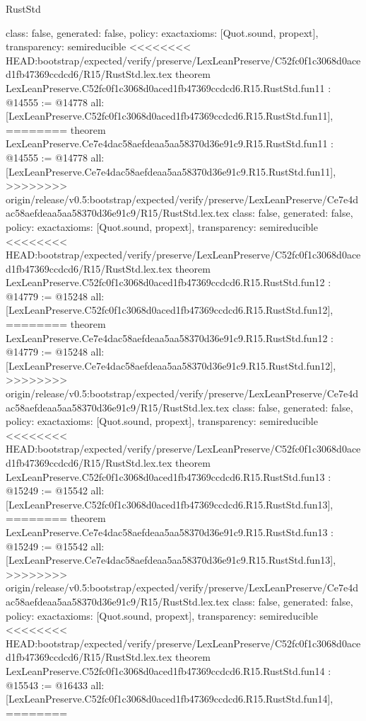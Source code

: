 \begin{lexlean}{RustStd}
\begin{coremodule}
{\begin{coremodule}
{{{{{{{{{{{{{{  class: false,
  generated: false,
  policy: exact{axioms: [Quot.sound, propext]},
  transparency: semireducible
}
<<<<<<<< HEAD:bootstrap/expected/verify/preserve/LexLeanPreserve/C52fc0f1c3068d0aced1fb47369ccdcd6/R15/RustStd.lex.tex
theorem LexLeanPreserve.C52fc0f1c3068d0aced1fb47369ccdcd6.R15.RustStd.fun11 : @14555 := @14778 {
  all: [LexLeanPreserve.C52fc0f1c3068d0aced1fb47369ccdcd6.R15.RustStd.fun11],
========
theorem LexLeanPreserve.Ce7e4dac58aefdeaa5aa58370d36e91c9.R15.RustStd.fun11 : @14555 := @14778 {
  all: [LexLeanPreserve.Ce7e4dac58aefdeaa5aa58370d36e91c9.R15.RustStd.fun11],
>>>>>>>> origin/release/v0.5:bootstrap/expected/verify/preserve/LexLeanPreserve/Ce7e4dac58aefdeaa5aa58370d36e91c9/R15/RustStd.lex.tex
  class: false,
  generated: false,
  policy: exact{axioms: [Quot.sound, propext]},
  transparency: semireducible
}
<<<<<<<< HEAD:bootstrap/expected/verify/preserve/LexLeanPreserve/C52fc0f1c3068d0aced1fb47369ccdcd6/R15/RustStd.lex.tex
theorem LexLeanPreserve.C52fc0f1c3068d0aced1fb47369ccdcd6.R15.RustStd.fun12 : @14779 := @15248 {
  all: [LexLeanPreserve.C52fc0f1c3068d0aced1fb47369ccdcd6.R15.RustStd.fun12],
========
theorem LexLeanPreserve.Ce7e4dac58aefdeaa5aa58370d36e91c9.R15.RustStd.fun12 : @14779 := @15248 {
  all: [LexLeanPreserve.Ce7e4dac58aefdeaa5aa58370d36e91c9.R15.RustStd.fun12],
>>>>>>>> origin/release/v0.5:bootstrap/expected/verify/preserve/LexLeanPreserve/Ce7e4dac58aefdeaa5aa58370d36e91c9/R15/RustStd.lex.tex
  class: false,
  generated: false,
  policy: exact{axioms: [Quot.sound, propext]},
  transparency: semireducible
}
<<<<<<<< HEAD:bootstrap/expected/verify/preserve/LexLeanPreserve/C52fc0f1c3068d0aced1fb47369ccdcd6/R15/RustStd.lex.tex
theorem LexLeanPreserve.C52fc0f1c3068d0aced1fb47369ccdcd6.R15.RustStd.fun13 : @15249 := @15542 {
  all: [LexLeanPreserve.C52fc0f1c3068d0aced1fb47369ccdcd6.R15.RustStd.fun13],
========
theorem LexLeanPreserve.Ce7e4dac58aefdeaa5aa58370d36e91c9.R15.RustStd.fun13 : @15249 := @15542 {
  all: [LexLeanPreserve.Ce7e4dac58aefdeaa5aa58370d36e91c9.R15.RustStd.fun13],
>>>>>>>> origin/release/v0.5:bootstrap/expected/verify/preserve/LexLeanPreserve/Ce7e4dac58aefdeaa5aa58370d36e91c9/R15/RustStd.lex.tex
  class: false,
  generated: false,
  policy: exact{axioms: [Quot.sound, propext]},
  transparency: semireducible
}
<<<<<<<< HEAD:bootstrap/expected/verify/preserve/LexLeanPreserve/C52fc0f1c3068d0aced1fb47369ccdcd6/R15/RustStd.lex.tex
theorem LexLeanPreserve.C52fc0f1c3068d0aced1fb47369ccdcd6.R15.RustStd.fun14 : @15543 := @16433 {
  all: [LexLeanPreserve.C52fc0f1c3068d0aced1fb47369ccdcd6.R15.RustStd.fun14],
========
}}}}}}}}}}}}}}}}}
\end{coremodule}}
\end{coremodule}
\end{lexlean}
